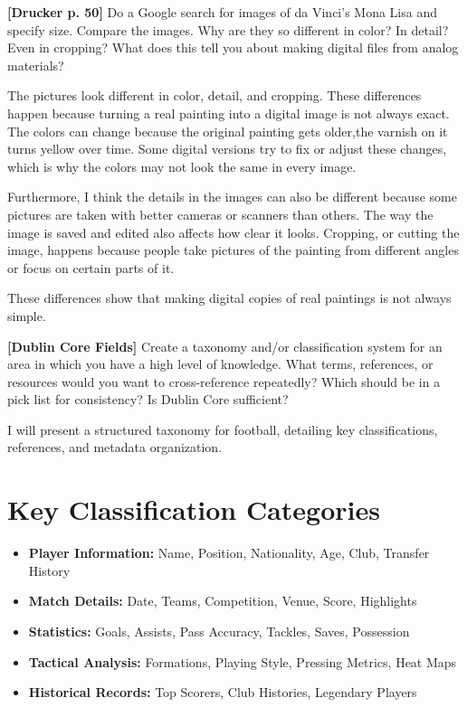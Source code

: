 \documentclass[a4paper]{exam}
\begin{document}
\begin{questions}
\vspace{4cm}

\question[5] \textbf{[Drucker p. 50]} Do a Google search for images of da Vinci’s Mona Lisa and specify size. Compare the images. Why are they so different in color? In detail? Even in cropping? What does this tell you about making digital files from analog materials?

 The pictures look different in color, detail, and cropping. These differences happen because turning a real painting into a digital image is not always exact. The colors can change because the original painting gets older,the varnish on it turns yellow over time. Some digital versions try to fix or adjust these changes, which is why the colors may not look the same in every image.  

Furthermore, I think the details in the images can also be different because some pictures are taken with better cameras or scanners than others. The way the image is saved and edited also affects how clear it looks. Cropping, or cutting the image, happens because people take pictures of the painting from different angles or focus on certain parts of it.  

These differences show that making digital copies of real paintings is not always simple. 

\question[10] \textbf{[Dublin Core Fields]} Create a taxonomy and/or classification system for an area in which you have a high level of knowledge. What terms, references, or resources would you want to cross-reference repeatedly? Which should be in a pick list for consistency? Is Dublin Core sufficient?

I will present a structured taxonomy for football, detailing key classifications, references, and metadata organization.

\section*{Key Classification Categories}
\begin{itemize}
    \item \textbf{Player Information:} Name, Position, Nationality, Age, Club, Transfer History
    \item \textbf{Match Details:} Date, Teams, Competition, Venue, Score, Highlights
    \item \textbf{Statistics:} Goals, Assists, Pass Accuracy, Tackles, Saves, Possession
    \item \textbf{Tactical Analysis:} Formations, Playing Style, Pressing Metrics, Heat Maps
    \item \textbf{Historical Records:} Top Scorers, Club Histories, Legendary Players
\end{itemize}


\end{questions}
\end{document}
